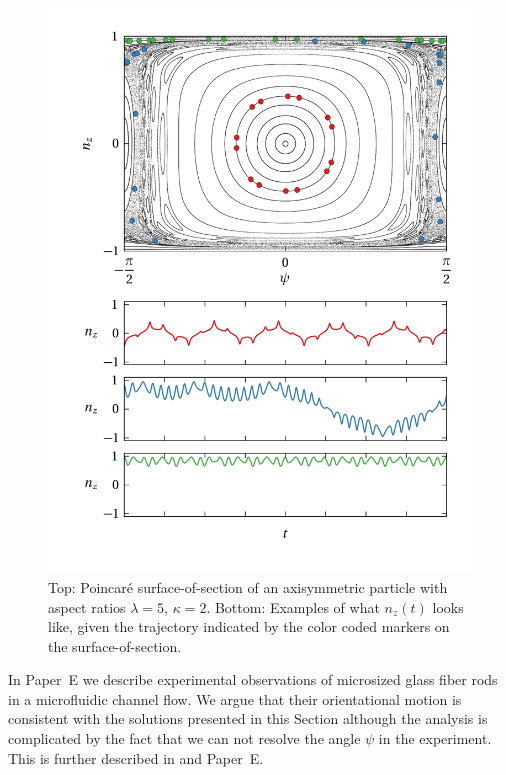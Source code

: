 \documentclass[thesis.tex]{subfiles}
\begin{document}
\begin{figure}
\centering
\includegraphics[width=12cm]{figs/poincare2o00.png}%
\caption{\label{fig:poincare2o00} Top: Poincar\'e surface-of-section of an axisymmetric particle with aspect ratios $\lambda=5$, $\kappa=2$. Bottom: Examples of what $n_z(t)$ looks like, given the trajectory indicated by the color coded markers on the surface-of-section. 
}
\end{figure}

In Paper~E we describe experimental observations of microsized glass fiber rods in a microfluidic channel flow. We argue that their orientational motion is consistent with the solutions presented in this Section although the analysis is complicated by the fact that we can not resolve the angle $\psi$ in the experiment. This is further described in  and Paper~E.
\end{document}
